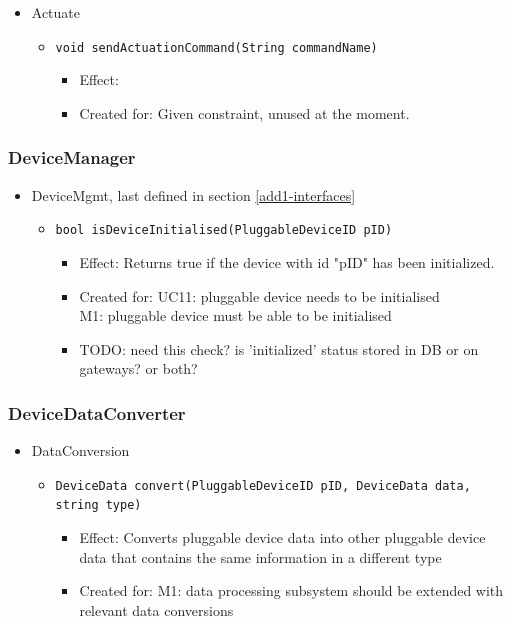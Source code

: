 \begin{itemize}
        	\item Actuate
        	\begin{itemize}
                \item \texttt{void sendActuationCommand(String commandName)}
                    \begin{itemize}
                        \item Effect:
                        \item Created for: Given constraint, unused at the moment.
                    \end{itemize}
        	\end{itemize}
        \end{itemize}

    \subsubsection{DeviceManager}
        \begin{itemize}
        	\item DeviceMgmt, last defined in section \ref{add1-interfaces}
        	\begin{itemize}
        		\item \texttt{bool isDeviceInitialised(PluggableDeviceID pID)}
        		\begin{itemize}
        			\item Effect: Returns true if the device with id "pID" has been initialized.
                    \item Created for: UC11: pluggable device needs to be initialised \\
                          M1: pluggable device must be able to be initialised
                    \item TODO: need this check? is 'initialized' status stored in DB or on gateways? or both?
        		\end{itemize}
        	\end{itemize}
        \end{itemize}

    \subsubsection{DeviceDataConverter}
    \begin{itemize}
        \item DataConversion
        \begin{itemize}
            \item \texttt{DeviceData convert(PluggableDeviceID pID, DeviceData data, string type)}
            \begin{itemize}
                \item Effect: Converts pluggable device data into other pluggable device
                      data that contains the same information in a different type
                \item Created for: M1: data processing subsystem should be
                      extended with relevant data conversions
            \end{itemize}
        \end{itemize}
    \end{itemize}

